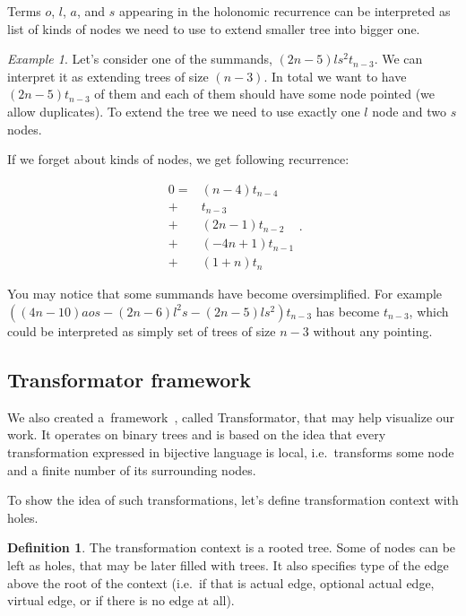 \documentclass[final]{article}
\theoremstyle{definition}
\newtheorem{definition}{Definition}[subsection]
\theoremstyle{definition}
\theoremstyle{remark}
\newtheorem{example}{Example}[subsection]
\begin{document}
Terms \(o\), \(l\), \(a\), and \(s\) appearing in the holonomic recurrence can be interpreted as list of kinds of nodes we need to use to extend smaller tree into bigger one.

\begin{example}
    Let's consider one of the summands, \((2n - 5) l s^2 t_{n - 3}\). We can interpret it as extending trees of size \((n - 3)\). In total we want to have \((2n - 5) t_{n - 3}\) of them and each of them should have some node pointed (we allow duplicates). To extend the tree we need to use exactly one \(l\) node and two \(s\) nodes.
\end{example}

If we forget about kinds of nodes, we get following recurrence:

\[\begin{array}{rl}
        0 =& (n - 4) t_{n - 4}\\
        +& t_{n - 3}\\
        +& (2 n - 1) t_{n - 2}\\
        +& (-4 n + 1) t_{n - 1}\\
        +& (1 + n) t_{n}
\end{array}.\]

You may notice that some summands have become oversimplified. For example \(((4 n - 10) a o s - (2 n - 6) l^2 s - (2 n - 5) l s^2) t_{n - 3}\) has become \(t_{n-3}\), which could be interpreted as simply set of trees of size \(n - 3\) without any pointing.

\subsection{Transformator framework}%
\label{sub:the_framework}

We also created a~framework~\cite{transformator}, called Transformator, that may help visualize our work. It operates on binary trees and is based on the idea that every transformation expressed in bijective language is local, i.e.~transforms some node and a finite number of its surrounding nodes.

To show the idea of such transformations, let's define transformation context with holes.

\begin{definition}
    The transformation context is a rooted tree. Some of nodes can be left as holes, that may be later filled with trees. It also specifies type of the edge above the root of the context (i.e.~if that is actual edge, optional actual edge, virtual edge, or if there is no edge at all).
\end{definition}
\end{document}
